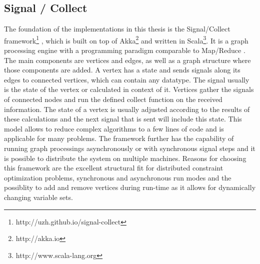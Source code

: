 \subsection{Signal / Collect}
The foundation of the implementations in this thesis is the Signal/Collect framework\footnote{http://uzh.github.io/signal-collect} \cite{Stutz2010}, which is built on top of Akka\footnote{http://akka.io} and written in Scala\footnote{http://www.scala-lang.org}. It is a graph processing engine with a programming paradigm comparable to Map/Reduce \cite{Dean2008}. The main components are vertices and edges, as well as a graph structure where those components are added. A vertex has a state and sends signals along its edges to connected vertices, which can contain any datatype. The signal usually is the state of the vertex or calculated in context of it. Vertices gather the signals of connected nodes and run the defined collect function on the received information. The state of a vertex is usually adjusted according to the results of these calculations and the next signal that is sent will include this state.  This model allows to reduce complex algorithms to a few lines of code and is applicable for many problems. The framework further has the capability of running graph processings asynchronously or with synchronous signal steps and it is possible to distribute the system on multiple machines. Reasons for choosing this framework are the excellent structural fit for distributed constraint optimization problems, synchronous and asynchronous run modes and the possiblity to add and remove vertices during run-time as it allows for dynamically changing variable sets.


